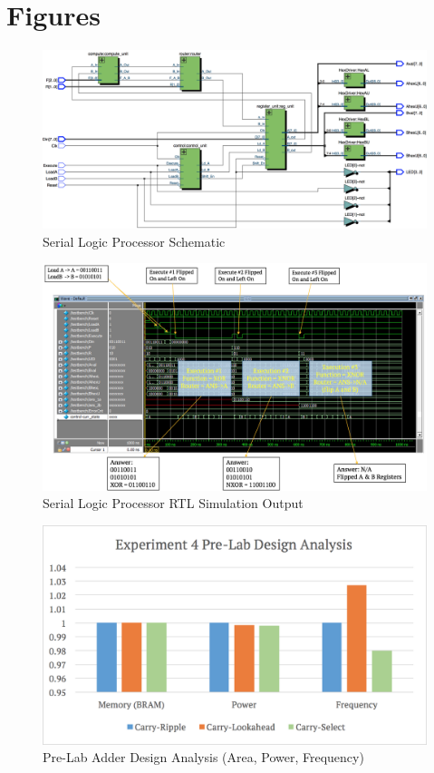 \documentclass[journal, twocolumn, final,11pt,letterpaper]{IEEEtran}
\begin{document}
\clearpage
\onecolumn
\section{Figures}

\begin{figure} [htbp]
	\centering
	\includegraphics[scale=0.35]{Schematic-Processor.png}
	\caption{Serial Logic Processor Schematic\label{fig:schematic-processor}}
\end{figure}

\begin{figure} [htbp]
	\centering
	\includegraphics[scale=0.55]{processor-output-rtl-simulator.png}
	\caption{Serial Logic Processor RTL Simulation Output\label{fig:processor-output-rtl-simulator}}
\end{figure}

\begin{figure} [htbp]
	\centering
	\includegraphics[scale=0.55]{pre-lab-design-analysis.png}
	\caption{Pre-Lab Adder Design Analysis (Area, Power, Frequency)\label{fig:pre-lab-design-analysis}}
\end{figure}
\end{document}
